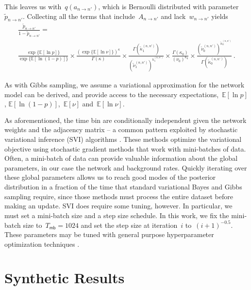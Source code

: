 This leaves us with~$q(a_{n \to n'})$, which is Bernoulli distributed
with parameter~$\widetilde{p}_{n \to n'}$.  Collecting all the terms
that include~$A_{n \to n'}$ and lack~$w_{n \to n'}$ yields
\begin{multline*}
 \frac{\widetilde{p}_{n \to n'}}{1-\widetilde{p}_{n \to n'}} =  \\
 \frac{\exp\{\mathbb{E} [\ln p] \} }{\exp\{\mathbb{E}[\ln (1-p)] \}} \times 
\frac{ (\exp\{\mathbb{E} [\ln \nu] \})^{\kappa} }{ \Gamma(\kappa)} \times 
\frac{\Gamma(\widetilde{\kappa}^{(n,n')}_1)}{ (\widetilde{\nu}^{(n,n')}_1)^{\widetilde{\kappa}^{(n,n')}_1} } \times
\frac{\Gamma(\kappa_0)}{ (\nu_0)^{\kappa_0} } \times
\frac{(\widetilde{\nu}^{(n,n')}_0)^{\widetilde{\kappa}^{(n,n')}_0}}{ \Gamma(\widetilde{\kappa}^{(n,n')}_0)}\,.
\end{multline*}

As with Gibbs sampling, we assume a variational approximation for the network model can be derived, and provide access to the necessary expectations,~$\mathbb{E}[\ln p]$, $\mathbb{E}[\ln(1-p)]$,~$\mathbb{E}[\nu]$ and~$\mathbb{E}[\ln \nu]$. 

As aforementioned, the time bin are conditionally independent given the network weights and the adjacency matrix -- a common pattern exploited by stochastic variational inference (SVI) algorithms \cite{Hoffman-2013}.
These methods optimize the variational objective using stochastic gradient methods that work with mini-batches of data.
Often, a mini-batch of data can provide valuable information about the global parameters, in our case the network and background rates. 
Quickly iterating over these global parameters allows us to reach good modes of the posterior distribution in a fraction of the time that standard variational Bayes and Gibbs sampling require, since those methods must process the entire dataset before making an update.
SVI does require some tuning, however. In particular, we must set a mini-batch size and a step size schedule.
In this work, we fix the mini-batch size to~${T_{\mathsf{mb}}=1024}$ and set the  step size at iteration~$i$ to~${(i+1)^{-0.5}}$.
These parameters may be  tuned with general purpose hyperparameter optimization techniques \cite{Snoek-2012}.

\section{Synthetic Results}

